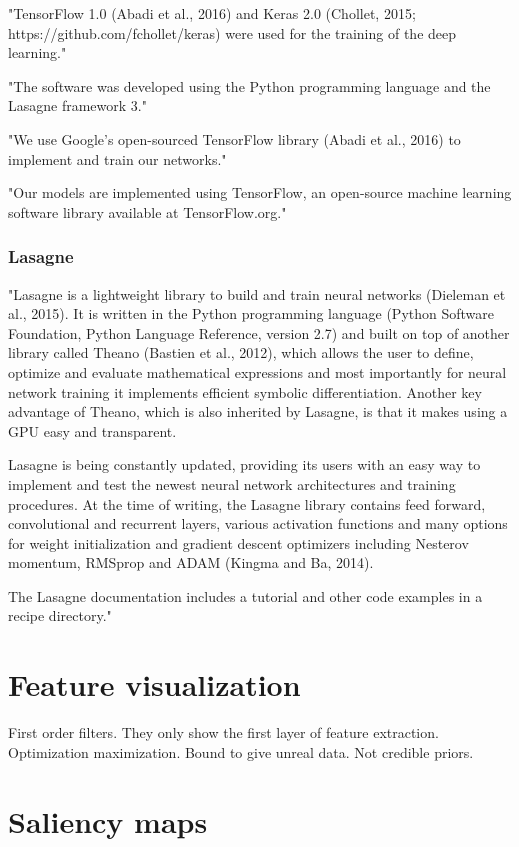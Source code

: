 "TensorFlow 1.0 (Abadi et al., 2016) and Keras 2.0 (Chollet, 2015; https://github.com/fchollet/keras) were used for the training of the deep learning." \cite{Fang2017}

"The software was developed using the Python programming language and the Lasagne framework 3." \cite{Hattori2017}

"We use Google’s open-sourced TensorFlow library (Abadi et al., 2016) to implement and train our networks." \cite{Heffernan2017}

"Our models are implemented using TensorFlow, an open-source machine learning software library available at TensorFlow.org." \cite{Busia2017}

	\subsubsection{Lasagne}
	"Lasagne is a lightweight library to build and train neural networks (Dieleman et al., 2015). It is written in the Python programming language (Python Software Foundation, Python Language Reference, version 2.7) and built on top of another library called Theano (Bastien et al., 2012), which allows the user to define, optimize and evaluate mathematical expressions and most importantly for neural network training it implements efficient symbolic differentiation. Another key advantage of Theano, which is also inherited by Lasagne, is that it makes using a GPU easy and transparent.
	
	Lasagne is being constantly updated, providing its users with an easy way to implement and test the newest neural network architectures and training procedures. At the time of writing, the Lasagne library contains feed forward, convolutional and recurrent layers, various activation functions and many options for weight initialization and gradient descent optimizers including Nesterov momentum, RMSprop and ADAM (Kingma and Ba, 2014). 
	
	The Lasagne documentation includes a tutorial and other code examples in a recipe directory." \cite{Jurtz2017}

\section{Feature visualization}
First order filters. They only show the first layer of feature extraction.
Optimization maximization. Bound to give unreal data. Not credible priors.


\section{Saliency maps}


